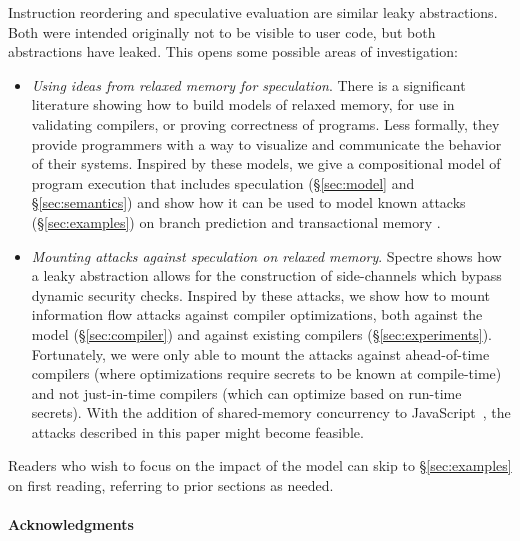 Instruction reordering and speculative evaluation are similar leaky abstractions.
Both were intended originally not to
be visible to user code, but both abstractions have leaked.
This opens some possible areas of investigation:
\begin{itemize}

\item \emph{Using ideas from relaxed memory for speculation}.  There is a
  significant literature showing how to build models of relaxed memory, for
  use in validating compilers, or proving correctness of programs.  Less
  formally, they provide programmers with a way to visualize and communicate
  the behavior of their systems.  Inspired by these models, we give a
  compositional model of program execution that includes speculation
  (\S\ref{sec:model} and \S\ref{sec:semantics}) and show how it can be used
  to model known attacks (\S\ref{sec:examples}) on branch prediction
  \cite{DBLP:journals/corr/abs-1801-01203} and transactional memory
  \cite{ChongSW18,DBLP:conf/uss/DisselkoenKPT17}.

\item \emph{Mounting attacks against speculation on relaxed memory}.
  Spectre shows how a leaky abstraction allows for the construction of
  side-channels which bypass dynamic security checks.
  Inspired by these
  attacks, we show how to mount information flow attacks against
  compiler optimizations, both against the model (\S\ref{sec:compiler})
  and against existing compilers (\S\ref{sec:experiments}).
  Fortunately, we were only able to mount the attacks against
  ahead-of-time compilers (where optimizations require secrets
  to be known at compile-time) and not just-in-time compilers
  (which can optimize based on run-time secrets).
  With the addition of shared-memory concurrency
  to JavaScript~\cite[\S24.2]{ecma-262}, the attacks described in this paper might
  become feasible.

\end{itemize}
Readers who wish to focus on the impact of the model can skip to \S\ref{sec:examples}
on first reading, referring to prior sections as needed.

\paragraph*{Acknowledgments}

